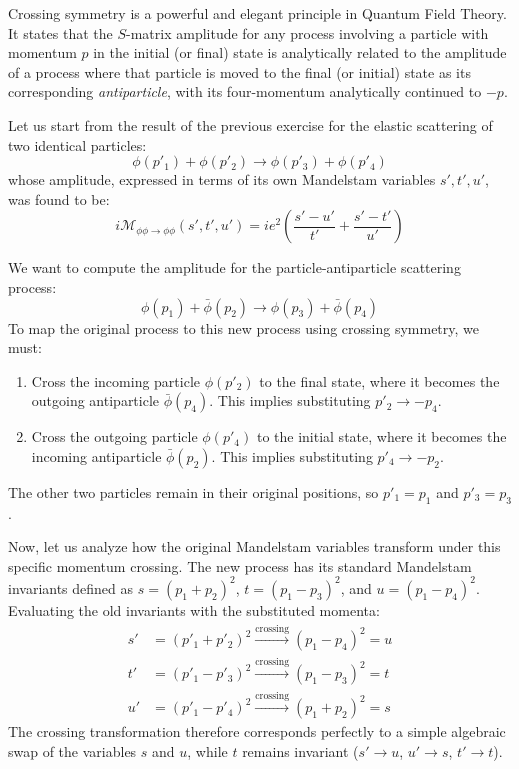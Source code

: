 Crossing symmetry is a powerful and elegant principle in Quantum Field Theory. It states that the $S$-matrix amplitude for any process involving a particle with momentum $p$ in the initial (or final) state is analytically related to the amplitude of a process where that particle is moved to the final (or initial) state as its corresponding \textit{antiparticle}, with its four-momentum analytically continued to $-p$.

Let us start from the result of the previous exercise for the elastic scattering of two identical particles:
\[
    \phi(p'_1) + \phi(p'_2) \to \phi(p'_3) + \phi(p'_4)
\]
whose amplitude, expressed in terms of its own Mandelstam variables $s', t', u'$, was found to be:
\[
    i\mathcal{M}_{\phi\phi \to \phi\phi}(s', t', u') = ie^2 \left( \frac{s' - u'}{t'} + \frac{s' - t'}{u'} \right)
\]

We want to compute the amplitude for the particle-antiparticle scattering process:
\[
    \phi(p_1) + \bar{\phi}(p_2) \to \phi(p_3) + \bar{\phi}(p_4)
\]
To map the original process to this new process using crossing symmetry, we must:
\begin{enumerate}
    \item Cross the incoming particle $\phi(p'_2)$ to the final state, where it becomes the outgoing antiparticle $\bar{\phi}(p_4)$. This implies substituting $p'_2 \to -p_4$.
    \item Cross the outgoing particle $\phi(p'_4)$ to the initial state, where it becomes the incoming antiparticle $\bar{\phi}(p_2)$. This implies substituting $p'_4 \to -p_2$.
\end{enumerate}
The other two particles remain in their original positions, so $p'_1 = p_1$ and $p'_3 = p_3$.

Now, let us analyze how the original Mandelstam variables transform under this specific momentum crossing. The new process has its standard Mandelstam invariants defined as $s = (p_1+p_2)^2$, $t = (p_1-p_3)^2$, and $u = (p_1-p_4)^2$.
Evaluating the old invariants with the substituted momenta:
\[
    \begin{aligned}
        s' & = (p'_1 + p'_2)^2 \xrightarrow{\text{crossing}} (p_1 - p_4)^2 = u \\
        t' & = (p'_1 - p'_3)^2 \xrightarrow{\text{crossing}} (p_1 - p_3)^2 = t \\
        u' & = (p'_1 - p'_4)^2 \xrightarrow{\text{crossing}} (p_1 + p_2)^2 = s
    \end{aligned}
\]
The crossing transformation therefore corresponds perfectly to a simple algebraic swap of the variables $s$ and $u$, while $t$ remains invariant ($s' \to u$, $u' \to s$, $t' \to t$).

